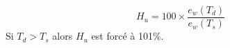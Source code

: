 \[
H_u = 100 \times \frac{ e_w(T_d)}{e_w(T_s)} 
\]
Si $T_d > T_s$ alors $H_u$ est forc\'e \`a 101\%.

